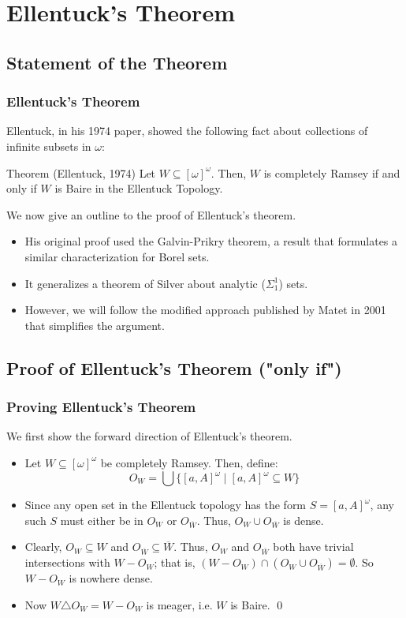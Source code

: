\documentclass[handout]{beamer}
\begin{document}
\section{Ellentuck's Theorem}

\subsection{Statement of the Theorem}
\begin{frame}
\frametitle{Ellentuck's Theorem}
Ellentuck, in his 1974 paper, showed the following fact about collections of infinite subsets in $\omega$: \pause
\begin{alertblock}{Theorem (Ellentuck, 1974)}
Let $W\subseteq[\omega]^\omega$. Then, $W$ is completely Ramsey if and only if $W$ is Baire in the Ellentuck Topology. 
\end{alertblock} \pause
We now give an outline to the proof of Ellentuck's theorem. \pause
\begin{itemize}[<+->]
    \item His original proof used the Galvin-Prikry theorem, a result that formulates a similar characterization for Borel sets. 
    \item It generalizes a theorem of Silver about analytic ($\Sigma_1^1$) sets. 
    \item However, we will follow the modified approach published by Matet in 2001 that simplifies the argument. 
\end{itemize}
\end{frame}

\subsection{Proof of Ellentuck's Theorem ("only if")}

\begin{frame}
\frametitle{Proving Ellentuck's Theorem}
We first show the forward direction of Ellentuck's theorem. 
\begin{itemize}
    \item<2-> Let $W\subseteq [\omega]^\omega$ be completely Ramsey. Then, define: 
        $$O_W = \bigcup \{[a,A]^\omega\mid [a,A]^\omega\subseteq W\}$$
    \item<3-> Since any open set in the Ellentuck topology has the form $S=[a,A]^\omega$, any such $S$ must either be in $O_W$ or $O_{\overline{W}}$. Thus, $O_W\cup O_{\overline{W}}$ is dense. 
    \item<4-> Clearly, $O_W\subseteq W$ and $O_{\overline{W}}\subseteq\overline{W}$. Thus, $O_W$ and $O_{\overline{W}}$ both have trivial intersections with $W-O_{W}$; that is, $(W-O_{W})\cap(O_W\cup O_{\overline{W}})=\emptyset$. So $W-O_W$ is nowhere dense. 
    \item<5-> Now $W\triangle O_W=W-O_W$ is meager, i.e. $W$ is Baire. \qed
\end{itemize}
\end{frame}
\end{document}
